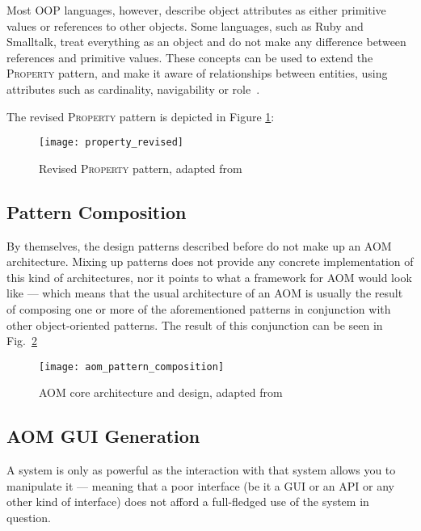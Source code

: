 Most OOP languages, however, describe object attributes as either primitive values or references to other objects. Some languages, such as Ruby and Smalltalk, treat everything as an object and do not make any difference between references and primitive values. These concepts can be used to extend the \textsc{Property} pattern, and make it aware of relationships between entities, using attributes such as cardinality, navigability or role~\cite{aom_research_roadmap}.

The revised \textsc{Property} pattern is depicted in Figure \ref{fig:property_revised}:

\begin{figure}[H]
  \centering
  \texttt{[image: property\_revised]}
  \caption{Revised \textsc{Property} pattern, adapted from \cite{aom_research_roadmap}}
  \label{fig:property_revised}
\end{figure}

\subsection{Pattern Composition}\label{sec:aom_pattern_composition}

By themselves, the design patterns described before do not make up an AOM architecture. Mixing up patterns does not provide any concrete implementation of this kind of architectures, nor it points to what a framework for AOM would look like --- which means that the usual architecture of an AOM is usually the result of composing one or more of the aforementioned patterns in conjunction with other object-oriented patterns. The result of this conjunction can be seen in Fig.~\ref{fig:aom_pattern_composition}

\begin{figure}[H]
  \centering
  \texttt{[image: aom\_pattern\_composition]}
  \caption{AOM core architecture and design, adapted from \cite{YBJ01}}
  \label{fig:aom_pattern_composition}
\end{figure}

\subsection{AOM GUI Generation}\label{sec:aom_gui_generation}

A system is only as powerful as the interaction with that system allows you to manipulate it --- meaning that a poor interface (be it a GUI or an API or any other kind of interface) does not afford a full-fledged use of the system in question.

